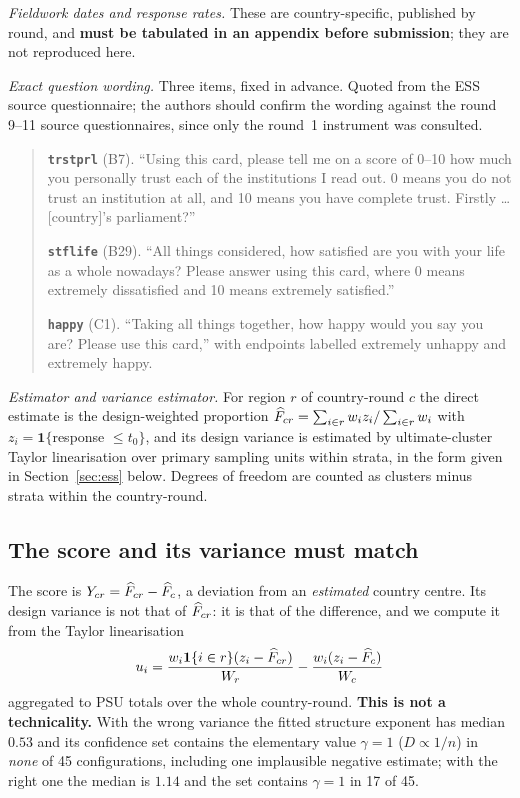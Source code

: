 \emph{Fieldwork dates and response rates.} These are country-specific, published
by round, and \textbf{must be tabulated in an appendix before submission};
they are not reproduced here.

\emph{Exact question wording.} Three items, fixed in advance. Quoted from the ESS
source questionnaire; the authors should confirm the wording against the round
9--11 source questionnaires, since only the round~1 instrument was consulted.

\begin{quote}\small
\textbf{\texttt{trstprl}} (B7). ``Using this card, please tell me on a score of
0--10 how much you personally trust each of the institutions I read out. 0 means
you do not trust an institution at all, and 10 means you have complete trust.
Firstly \dots{} [country]'s parliament?''

\textbf{\texttt{stflife}} (B29). ``All things considered, how satisfied are you
with your life as a whole nowadays? Please answer using this card, where 0 means
extremely dissatisfied and 10 means extremely satisfied.''

\textbf{\texttt{happy}} (C1). ``Taking all things together, how happy would you
say you are? Please use this card,'' with endpoints labelled extremely unhappy
and extremely happy.
\end{quote}

\emph{Estimator and variance estimator.} For region $r$ of country-round $c$ the
direct estimate is the design-weighted proportion
$\widehat F_{cr}=\sum_{i\in r}w_iz_i/\sum_{i\in r}w_i$ with
$z_i=\mathbf 1\{$response $\le t_0\}$, and its design variance is estimated by
ultimate-cluster Taylor linearisation over primary sampling units within strata,
in the form given in Section~\ref{sec:ess} below. Degrees of freedom are counted
as clusters minus strata within the country-round.

\subsection{The score and its variance must match}

The score is $Y_{cr}=\widehat F_{cr}-\widehat F_c$, a deviation from an \emph{estimated}
country centre. Its design variance is not that of $\widehat F_{cr}$: it is that of the
difference, and we compute it from the Taylor linearisation
\[
u_i=\frac{w_i\mathbf 1\{i\in r\}(z_i-\widehat F_{cr})}{W_r}-\frac{w_i(z_i-\widehat F_c)}{W_c}
\]
aggregated to PSU totals over the whole country-round. \textbf{This is not a
technicality.} With the wrong variance the fitted structure exponent has median
$0.53$ and its confidence set contains the elementary value $\gamma=1$
($D\propto1/n$) in \emph{none} of 45 configurations, including one implausible
negative estimate; with the right one the median is $1.14$ and the set contains
$\gamma=1$ in 17 of 45.

